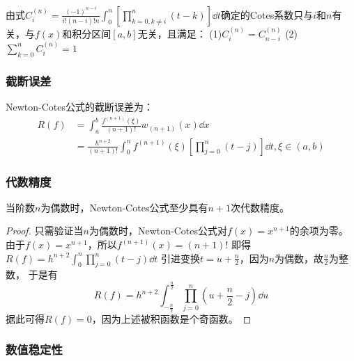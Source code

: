\begin{notice}
    由式$C_i^{(n)} = \frac{(-1)^{n-i}}{i!(n-i)!n}\int_{0}^{n}[\prod_{k=0,k\neq i}^{n}(t-k)]\dd{t}$确定的Cotes系数只与$i$和$n$有关，与$f(x)$和积分区间$[a,b]$无关，且满足：
    (1)$C_i^{(n)} = C_{n-i}^{(n)}$
    (2)$\sum_{k=0}^{n}C_i^{(n)} = 1$
\end{notice}

\subsubsection{截断误差}
Newton-Cotes公式的截断误差为：
\begin{align*}
    R(f) &= \int_{a}^{b}\frac{f^{(n+1)}(\xi)}{(n+1)!}w_{(n+1)}(x)\dd{x} \\
    &= \frac{h^{n+2}}{(n+1)!}\int_{0}^{n}f^{(n+1)}(\xi)[\prod_{j=0}^{n}(t-j)]\dd{t},\xi \in (a,b)
\end{align*}

\subsubsection{代数精度}
\begin{theorem}
    当阶数$n$为偶数时，Newton-Cotes公式至少具有$n+1$次代数精度。
\end{theorem}

\begin{proof}
    只需验证当$n$为偶数时，Newton-Cotes公式对$f(x) = x^{n+1}$的余项为零。
    由于$f(x) = x^{n+1}$，所以$f^{(n+1)}(x) = (n+1)!$ 
    即得$R(f) = h^{n+2}\int_{0}^{n}\prod_{j=0}^{n}(t-j)\dd{t}$
    引进变换$t = u+\frac{n}{2}$，因为$n$为偶数，故$\frac{n}{2}$为整数，
    于是有
    \begin{equation*}
        R(f) = h^{n+2}\int_{-\frac{n}{2}}^{\frac{n}{2}}\prod_{j=0}^{n}(u+\frac{n}{2}-j)\dd{u}
    \end{equation*}
    据此可得$R(f)=0$，因为上述被积函数是个奇函数。
\end{proof}

\subsubsection{数值稳定性}


